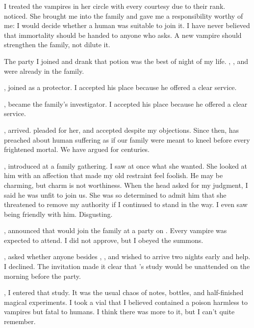 {I treated the vampires in her circle with every courtesy due to their rank.  noticed. She brought me into the family and gave me a responsibility worthy of me: I would decide whether a human was suitable to join it. I have never believed that immortality should be handed to anyone who asks. A new vampire should strengthen the family, not dilute it.

The party I joined and drank that potion was the best of night of my life. , ,  and  were already in the family.

,  joined as a protector. I accepted his place because he offered a clear service.

,  became the family's investigator. I accepted his place because he offered a clear service.

,  arrived.  pleaded for her, and  accepted despite my objections. Since then,  has preached about human suffering as if our family were meant to kneel before every frightened mortal. We have argued for centuries.

,  introduced  at a family gathering. I saw at once what she wanted. She looked at him with an affection that made my old restraint feel foolish. He may be charming, but charm is not worthiness. When the head asked for my judgment, I said he was unfit to join us. She was so determined to admit him that she threatened to remove my authority if I continued to stand in the way. I even saw  being friendly with him. Disgusting.

,  announced that  would join the family at a party on . Every vampire was expected to attend. I did not approve, but I obeyed the summons.

,  asked whether anyone besides , , and  wished to arrive two nights early and help. I declined. The invitation made it clear that 's study would be unattended on the morning before the party.

, I entered that study. It was the usual chaos of notes, bottles, and half-finished magical experiments. I took a vial that I believed contained a poison harmless to vampires but fatal to humans. I think there was more to it, but I can't quite remember.

}
